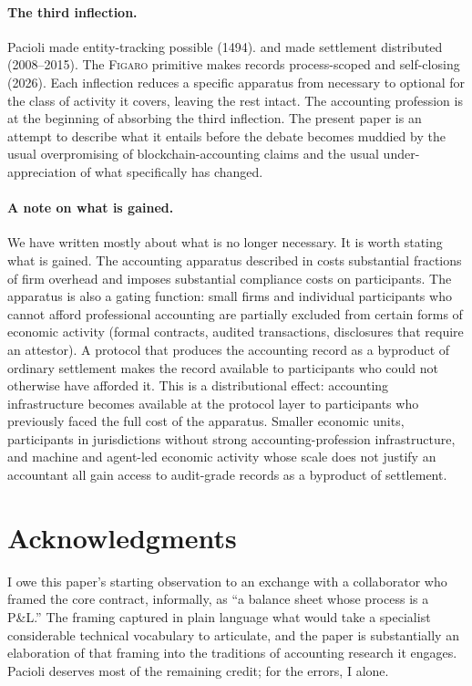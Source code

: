 \documentclass[11pt,a4paper]{article}
\theoremstyle{definition}
\theoremstyle{remark}
\newcommand{\figaro}{\textsc{Figaro}}
\begin{document}
\paragraph{The third inflection.}
Pacioli made entity-tracking possible (1494).
\citet{nakamoto2008bitcoin} and \citet{buterin2014ethereum}
made settlement distributed (2008--2015). The \figaro{}
primitive makes records process-scoped and self-closing
(2026). Each inflection reduces a specific apparatus from
necessary to optional for the class of activity it covers,
leaving the rest intact. The accounting profession is at
the beginning of absorbing the third inflection. The
present paper is an attempt to describe what it entails
before the debate becomes muddied by the usual
overpromising of blockchain-accounting claims and the
usual under-appreciation of what specifically has changed.

\paragraph{A note on what is gained.}
We have written mostly about what is no longer necessary.
It is worth stating what is gained. The accounting apparatus
described in  costs substantial
fractions of firm overhead and imposes substantial
compliance costs on participants. The apparatus is also a
gating function: small firms and individual participants who
cannot afford professional accounting are partially excluded
from certain forms of economic activity (formal contracts,
audited transactions, disclosures that require an attestor).
A protocol that produces the accounting record as a byproduct
of ordinary settlement makes the record available to
participants who could not otherwise have afforded it. This
is a distributional effect: accounting infrastructure becomes
available at the protocol layer to participants who
previously faced the full cost of the apparatus. Smaller
economic units, participants in jurisdictions without strong
accounting-profession infrastructure, and machine and
agent-led economic activity whose scale does not justify an
accountant all gain access to audit-grade records as a
byproduct of settlement.

\section*{Acknowledgments}
I owe this paper's starting observation to an exchange with
a collaborator who framed the core contract, informally, as
``a balance sheet whose process is a P\&L.'' The framing
captured in plain language what would take a specialist
considerable technical vocabulary to articulate, and the
paper is substantially an elaboration of that framing into
the traditions of accounting research it engages. Pacioli
deserves most of the remaining credit; for the errors, I
alone.
\end{document}

